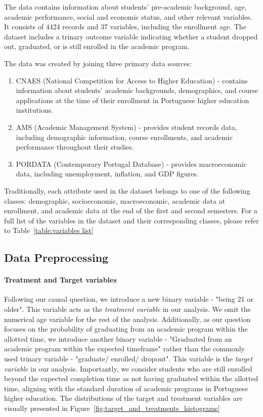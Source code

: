 \documentclass{article}
\newcommand{\gur}[1]{{\color{teal}{Gur: #1}}}
\begin{document}
The data contains information about students' pre-academic background, age, academic performance, social and economic status, and other relevant variables. It consists of 4424 records and 37 variables, including the enrollment age. The dataset includes a trinary outcome variable indicating whether a student dropped out, graduated, or is still enrolled in the academic program. 

The data was created by joining three primary data sources: 
\begin{enumerate}
    \item CNAES (National Competition for Access to Higher Education) - contains information about students' academic backgrounds, demographics, and course applications at the time of their enrollment in Portuguese higher education institutions.
    \item AMS (Academic Management System) - provides student records data, including demographic information, course enrollments, and academic performance throughout their studies.
    \item PORDATA (Contemporary Portugal Database) - provides macroeconomic data, including unemployment, inflation, and GDP figures.
\end{enumerate}

Traditionally, each attribute used in the dataset belongs to one of the following classes: demographic,
socioeconomic, macroeconomic, academic data at enrollment, and academic data at the end of the first and second semesters. For a full list of the variables in the dataset and their corresponding classes, please refer to Table~\ref{table:variables list}

\subsection{Data Preprocessing}

\gur{removal of application mode 39 because it is too similar to treatment}

\paragraph{Treatment and Target variables} Following our causal question, we introduce a new binary variable - "being 21 or older". This variable acts as the \emph{treatment variable} in our analysis. We omit the numerical age variable for the rest of the analysis. Additionally, as our question focuses on the probability of graduating from an academic program within the allotted time, we introduce another binary variable - "Graduated from an academic program within the expected timeframe" rather than the commonly used trinary variable - "graduate/ enrolled/ dropout". This variable is the \emph{target variable} in our analysis. Importantly, we consider students who are still enrolled beyond the expected completion time as not having graduated within the allotted time, aligning with the standard duration of academic programs in Portuguese higher education. The distributions of the target and treatment variables are visually presented in Figure~\ref{fig:target_and_treatments_histograms}
\end{document}
